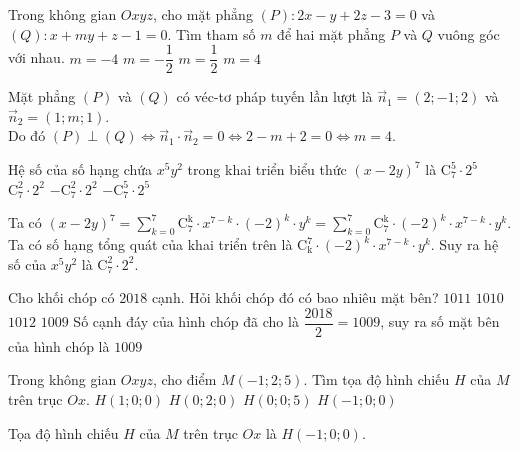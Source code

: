 \begin{ex}%
	Trong không gian $Oxyz$, cho mặt phẳng $(P)\colon 2x-y+2z-3=0$ và $(Q) \colon x+my+z-1=0$. Tìm tham số $m$ để hai mặt phẳng $P$ và $Q$ vuông góc với nhau.
		\choice
	{$m=-4$}
	{$m=- \dfrac{1}{2}$}
	{$m=\dfrac{1}{2}$}
	{\True $m=4$}
	\loigiai
	{ Mặt phẳng $(P)$ và $(Q)$ có véc-tơ pháp tuyến lần lượt là $\vec{n}_1=(2;-1;2)$ và $\vec{n}_2=(1;m;1)$. \\
	Do đó $(P) \perp (Q) \Leftrightarrow \vec{n}_1 \cdot \vec{n}_2=0 \Leftrightarrow 2-m+2=0 \Leftrightarrow m=4$.
		
	}
\end{ex}

\begin{ex}%
	Hệ số của số hạng chứa $x^5y^2$ trong khai triển biểu thức $(x-2y)^7$ là
		\choice
	{$\mathrm{C}_7^5 \cdot 2^5$}
	{\True $\mathrm{C}_7^2 \cdot 2^2$}
	{$- \mathrm{C}_7^2 \cdot 2^2$}
	{$-\mathrm{C}_7^5\cdot 2^5$}
	\loigiai
	{ Ta có $(x-2y)^7 =\sum\limits_{k=0}^7 \mathrm{C_7^k}\cdot x^{7-k} \cdot (-2)^k \cdot y^k =\sum\limits_{k=0}^7 \mathrm{C_7^k} \cdot (-2)^k \cdot x^{7-k} \cdot y^k$.\\
		Ta có số hạng tổng quát của khai triển trên là $\mathrm{C_k^7} \cdot (-2)^k \cdot x^{7-k} \cdot y^k$. Suy ra hệ số của $x^5y^2$ là  $\mathrm{C}_7^2 \cdot 2^2$.
		
	}
\end{ex}

\begin{ex}%
	Cho khối chóp có $2018$ cạnh. Hỏi khối chóp đó có bao nhiêu mặt bên?
		\choice
	{$1011$}
	{$1010$}
	{$1012$}
	{\True $1009$}
	\loigiai
	{ Số cạnh đáy của hình chóp đã cho là $\dfrac{2018}{2}=1009$, suy ra số mặt bên của hình chóp là $1009$
	}
\end{ex}

\begin{ex}%
	Trong không gian $Oxyz$, cho điểm $M(-1;2;5)$. Tìm tọa độ hình chiếu $H$ của $M$ trên trục $Ox$.
		\choice
	{$H(1;0;0)$}
	{$H(0;2;0)$}
	{$H(0;0;5)$}
	{\True $H(-1;0;0)$}
	\loigiai
	{Tọa độ hình chiếu $H$ của $M$ trên trục $Ox$ là $H(-1;0;0)$.
		
	}
\end{ex}

